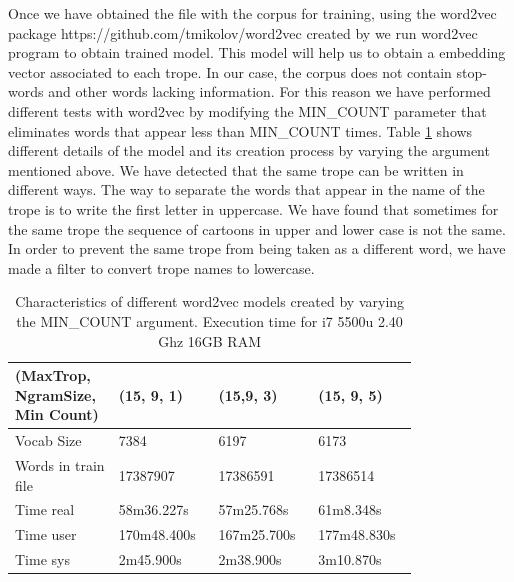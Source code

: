 \documentclass[letterpaper]{article}
\begin{document}
	   Once we have obtained the file with the corpus for training, using the word2vec package https://github.com/tmikolov/word2vec created by
	   \cite{mikolov2013} we run word2vec program to obtain trained model. This model will help us to obtain a embedding vector associated to each trope.
	   In our case, the corpus does not contain stop-words and other words lacking information. For this reason we have performed different tests with
	   word2vec by modifying the MIN\_COUNT parameter that eliminates words that appear less than MIN\_COUNT times. Table \ref{tab:variations-with-min-count-argument-15-9}
	   shows different details of the model and its creation process by varying the argument mentioned above.
	   We have detected that the same trope can be written in different ways. The way to separate the words that appear in the name of the trope is to write
	    the first letter in uppercase. We have found that sometimes for the same trope the sequence of cartoons in upper and lower case is not the same. 
	   In order to prevent the same trope from being taken as a different word, we have made a filter to convert trope names to lowercase.
	   
	   
	\begin{table}[t]
		\centering
		\begin{tabular}{|p{0.20\linewidth}|p{0.2\linewidth}|p{0.2\linewidth}|p{0.2\linewidth}|}
			\hline
			\textbf{(MaxTrop, NgramSize, Min Count)}& \textbf{(15, 9, 1)} & \textbf{(15,9, 3)} & \textbf{(15, 9, 5)}\\
			\hline
			\hline
			Vocab Size& 7384 & 6197 & 6173 \\
			\hline
			Words in train file& 17387907 & 17386591 & 17386514 \\
			\hline
			Time real&58m36.227s&57m25.768s&61m8.348s\\
			\hline
			Time user&170m48.400s&167m25.700s&177m48.830s\\
			\hline
			Time sys&2m45.900s&2m38.900s&3m10.870s\\
			\hline
			
		\end{tabular}
		\caption{Characteristics of different word2vec models created by varying the MIN\_COUNT argument. Execution time for i7 5500u 2.40 Ghz 16GB RAM}
		\label{tab:variations-with-min-count-argument-15-9}
	\end{table}	
	
\end{document}

